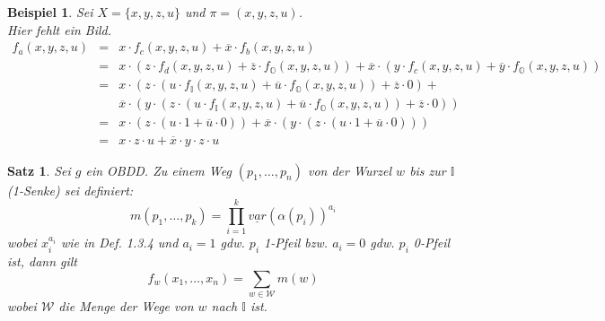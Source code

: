 \documentclass[ngerman]{scrartcl}
\theoremstyle{custom}
\newtheorem{mex}[mdef]{Beispiel}
\newtheorem{ms}[mdef]{Satz}
\newcommand{\0}{\mathbf{0}}
\newcommand{\1}{\mathbf{L}}
\begin{document}
\begin{mex}
Sei $X=\{x,y,z,u\}$ und $\pi=(x,y,z,u)$. \\
Hier fehlt ein Bild.\\
\begin{eqnarray*}
f_a(x,y,z,u) &=& x \cdot f_c(x,y,z,u) + \overline{x} \cdot
f_b(x,y,z,u) \\
&= & x \cdot (z \cdot f_d(x,y,z,u) + \overline{z} \cdot f_{\mathds{O}}(x,y,z,u))
+ \overline{x} \cdot (y \cdot f_c(x,y,z,u) + \overline{y} \cdot
f_{\mathds{O}}(x,y,z,u))\\
&=& x \cdot (z \cdot (u \cdot f_{\mathds{I}}(x,y,z,u) + \overline{u} \cdot
f_{\mathds{O}}(x,y,z,u)) + \overline{z} \cdot 0) + \\ && \overline{x} \cdot
(y \cdot (z \cdot (u \cdot f_{\mathds{I}}(x,y,z,u) + \overline{u}
\cdot f_{\mathds{O}}(x,y,z,u)) + \overline{z} \cdot 0)) \\
&=& x \cdot (z \cdot (u \cdot 1 + \overline{u} \cdot 0)) +
\overline{x} \cdot (y \cdot (z \cdot (u \cdot 1 + \overline{u} \cdot
0)))\\
&=& x \cdot z \cdot u + \overline{x} \cdot y \cdot z \cdot u 
\end{eqnarray*}
\end{mex}

\begin{ms}
Sei $g$ ein OBDD. Zu einem Weg $(p_1,\dots,p_n)$ von der Wurzel $w$
bis zur $\mathds{I}$ (1-Senke) sei definiert:
\begin{equation*}
m(p_1,\dots,p_k) = \prod_{i=1}^{k}
\underline{var}(\alpha(p_i))^{a_i}
\end{equation*}
wobei $x_i^{a_i}$ wie in Def. 1.3.4 und $a_i=1$ gdw. $p_i$ 1-Pfeil bzw. $a_i=0$ gdw. $p_i$
0-Pfeil ist, dann gilt 
\begin{equation*} f_w(x_1,\dots,x_n) = \sum_{w \in \mathcal{W}}
m(w)
\end{equation*}
wobei $\mathcal{W}$ die Menge der Wege von $w$ nach
$\mathds{I}$ ist.
\end{ms}
\end{document}
